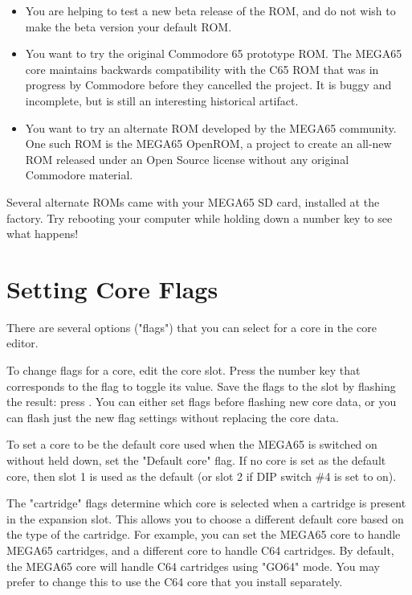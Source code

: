 \begin{itemize}
  \item You are helping to test a new beta release of the ROM, and do not wish to make the beta version your default ROM.
  \item You want to try the original Commodore 65 prototype ROM. The MEGA65 core maintains backwards compatibility with the C65 ROM that was in progress by Commodore before they cancelled the project. It is buggy and incomplete, but is still an interesting historical artifact.
  \item You want to try an alternate ROM developed by the MEGA65 community. One such ROM is the MEGA65 OpenROM, a project to create an all-new ROM released under an Open Source license without any original Commodore material.
\end{itemize}

Several alternate ROMs came with your MEGA65 SD card, installed at the factory. Try rebooting your computer while holding down a number key to see what happens!

\section{Setting Core Flags}

There are several options ("flags") that you can select for a core in the core editor.

To change flags for a core, edit the core slot. Press the number key that corresponds to the flag to toggle its value. Save the flags to the slot by flashing the result: press . You can either set flags before flashing new core data, or you can flash just the new flag settings without replacing the core data.

To set a core to be the default core used when the MEGA65 is switched on without  held down, set the "Default core" flag. If no core is set as the default core, then slot 1 is used as the default (or slot 2 if DIP switch \#4 is set to on).

The "cartridge" flags determine which core is selected when a cartridge is present in the expansion slot. This allows you to choose a different default core based on the type of the cartridge. For example, you can set the MEGA65 core to handle MEGA65 cartridges, and a different core to handle C64 cartridges. By default, the MEGA65 core will handle C64 cartridges using "GO64" mode. You may prefer to change this to use the C64 core that you install separately.

